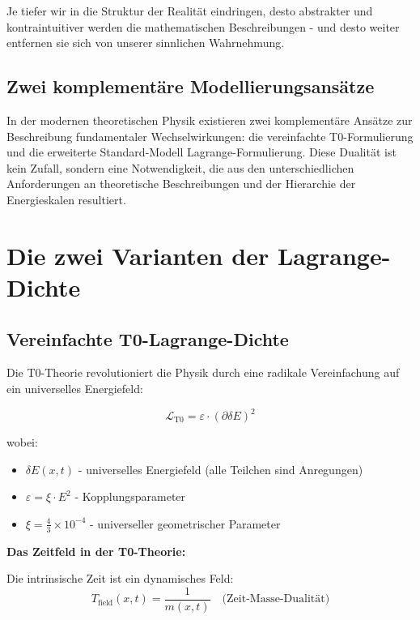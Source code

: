 \documentclass[12pt,a4paper]{article}
\begin{document}
	Je tiefer wir in die Struktur der Realität eindringen, desto abstrakter und kontraintuitiver werden die mathematischen Beschreibungen - und desto weiter entfernen sie sich von unserer sinnlichen Wahrnehmung.
	
	\subsection{Zwei komplementäre Modellierungsansätze}
	
	In der modernen theoretischen Physik existieren zwei komplementäre Ansätze zur Beschreibung fundamentaler Wechselwirkungen: die vereinfachte T0-Formulierung und die erweiterte Standard-Modell Lagrange-Formulierung. Diese Dualität ist kein Zufall, sondern eine Notwendigkeit, die aus den unterschiedlichen Anforderungen an theoretische Beschreibungen und der Hierarchie der Energieskalen resultiert.
	
	\section{Die zwei Varianten der Lagrange-Dichte}
	
	\subsection{Vereinfachte T0-Lagrange-Dichte}
	
	Die T0-Theorie revolutioniert die Physik durch eine radikale Vereinfachung auf ein universelles Energiefeld:
	
	\begin{t0box}
		\begin{equation}
			\mathcal{L}_{\text{T0}} = \varepsilon \cdot (\partial\delta E)^2
		\end{equation}
		
		wobei:
		\begin{itemize}
			\item $\delta E(x,t)$ - universelles Energiefeld (alle Teilchen sind Anregungen)
			\item $\varepsilon = \xi \cdot E^2$ - Kopplungsparameter
			\item $\xi = \frac{4}{3} \times 10^{-4}$ - universeller geometrischer Parameter
		\end{itemize}
	\end{t0box}
	
	\textbf{Das Zeitfeld in der T0-Theorie:}
	
	Die intrinsische Zeit ist ein dynamisches Feld:
	\begin{equation}
		T_{\text{field}}(x,t) = \frac{1}{m(x,t)} \quad \text{(Zeit-Masse-Dualität)}
	\end{equation}
	
\end{document}
